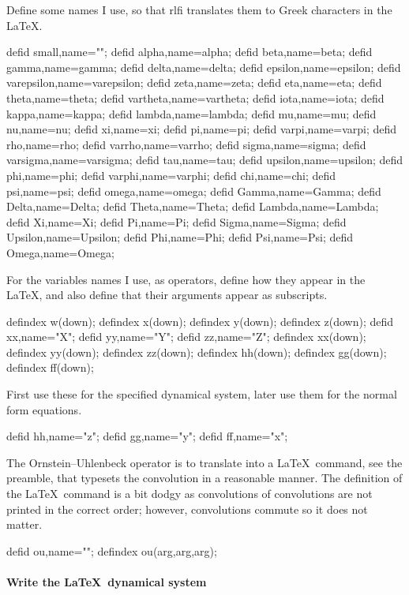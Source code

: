 \documentclass[11pt,a5paper]{article}
\def\ou\big(#1,#2,#3\big){{{\rm e}^{\if#31\else#3\fi t}\star}#1\,}
\def\eps{\varepsilon}
\begin{document}
Define some names I use, so that rlfi translates them to Greek characters in the \LaTeX.
\begin{reduce}
defid small,name="\eps";%
defid alpha,name=alpha;
defid beta,name=beta;
defid gamma,name=gamma;
defid delta,name=delta;
defid epsilon,name=epsilon;
defid varepsilon,name=varepsilon;
defid zeta,name=zeta;
defid eta,name=eta;
defid theta,name=theta;
defid vartheta,name=vartheta;
defid iota,name=iota;
defid kappa,name=kappa;
defid lambda,name=lambda;
defid mu,name=mu;
defid nu,name=nu;
defid xi,name=xi;
defid pi,name=pi;
defid varpi,name=varpi;
defid rho,name=rho;
defid varrho,name=varrho;
defid sigma,name=sigma;
defid varsigma,name=varsigma;
defid tau,name=tau;
defid upsilon,name=upsilon;
defid phi,name=phi;
defid varphi,name=varphi;
defid chi,name=chi;
defid psi,name=psi;
defid omega,name=omega;
defid Gamma,name=Gamma;
defid Delta,name=Delta;
defid Theta,name=Theta;
defid Lambda,name=Lambda;
defid Xi,name=Xi;
defid Pi,name=Pi;
defid Sigma,name=Sigma;
defid Upsilon,name=Upsilon;
defid Phi,name=Phi;
defid Psi,name=Psi;
defid Omega,name=Omega;
\end{reduce}

For the variables names I use, as operators, define how they appear in the \LaTeX, and also define that their arguments appear as subscripts.
\begin{reduce}
defindex w(down);
defindex x(down);
defindex y(down);
defindex z(down);
defid xx,name="X";
defid yy,name="Y";
defid zz,name="Z";
defindex xx(down);
defindex yy(down);
defindex zz(down);
defindex hh(down);
defindex gg(down);
defindex ff(down);
\end{reduce}

First use these for the specified dynamical system, later use them for the normal form equations.
\begin{reduce}
defid hh,name="\dot z";
defid gg,name="\dot y";
defid ff,name="\dot x";
\end{reduce}

The Ornstein--Uhlenbeck operator is to translate into a \LaTeX\ command, see the preamble, that typesets the convolution in a reasonable manner.
The definition of the \LaTeX\ command is a bit dodgy as convolutions of convolutions are not printed in the correct order; however,  convolutions commute so it does not matter.
\begin{reduce}
defid ou,name="\ou";
defindex ou(arg,arg,arg);
\end{reduce}


\paragraph{Write the \LaTeX\ dynamical system}
\end{document}
